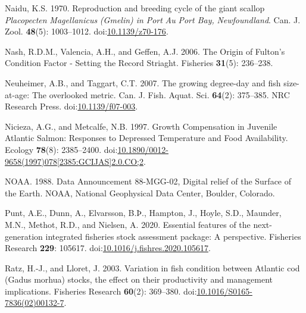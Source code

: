 \documentclass[
]{article}
\newlength{\cslhangindent}
\newlength{\cslentryspacingunit} %
\newenvironment{CSLReferences}[2] %
 {%
  \setlength{\parindent}{0pt}
  \ifodd #1
  \let\oldpar\par
  \def\par{\hangindent=\cslhangindent\oldpar}
  \fi
  \setlength{\parskip}{#2\cslentryspacingunit}
 }%
 {}
\begin{document}
\begin{CSLReferences}{1}{0}
\leavevmode{}%
Naidu, K.S. 1970. Reproduction and breeding cycle of the giant scallop {\emph{Placopecten}}{ \emph{Magellanicus}}{ \emph{\emph{(}}}{\emph{\emph{Gmelin}}}{\emph{\emph{) in}} }{\emph{\emph{Port}}}{ \emph{\emph{Au}} }{\emph{\emph{Port Bay}}}{\emph{\emph{,}} }{\emph{\emph{Newfoundland}}}. Can. J. Zool. \textbf{48}(5): 1003--1012. doi:\href{https://doi.org/10.1139/z70-176}{10.1139/z70-176}.

\leavevmode{}%
Nash, R.D.M., Valencia, A.H., and Geffen, A.J. 2006. The {Origin} of {Fulton}'s {Condition Factor} - {Setting} the {Record Striaght}. Fisheries \textbf{31}(5): 236--238.

\leavevmode{}%
Neuheimer, A.B., and Taggart, C.T. 2007. The growing degree-day and fish size-at-age: The overlooked metric. Can. J. Fish. Aquat. Sci. \textbf{64}(2): 375--385. {NRC Research Press}. doi:\href{https://doi.org/10.1139/f07-003}{10.1139/f07-003}.

\leavevmode{}%
Nicieza, A.G., and Metcalfe, N.B. 1997. Growth {Compensation} in {Juvenile Atlantic Salmon}: {Responses} to {Depressed Temperature} and {Food Availability}. Ecology \textbf{78}(8): 2385--2400. doi:\href{https://doi.org/10.1890/0012-9658(1997)078\%5B2385:GCIJAS\%5D2.0.CO;2}{10.1890/0012-9658(1997)078{[}2385:GCIJAS{]}2.0.CO;2}.

\leavevmode{}%
NOAA. 1988. Data {Announcement} 88-{MGG-02}, {Digital} relief of the {Surface} of the {Earth}. {NOAA, National Geophysical Data Center}, {Boulder, Colorado}.

\leavevmode{}%
Punt, A.E., Dunn, A., Elvarsson, B.Þ., Hampton, J., Hoyle, S.D., Maunder, M.N., Methot, R.D., and Nielsen, A. 2020. Essential features of the next-generation integrated fisheries stock assessment package: {A} perspective. Fisheries Research \textbf{229}: 105617. doi:\href{https://doi.org/10.1016/j.fishres.2020.105617}{10.1016/j.fishres.2020.105617}.

\leavevmode{}%
Ratz, H.-J., and Lloret, J. 2003. Variation in fish condition between {Atlantic} cod ({Gadus} morhua) stocks, the effect on their productivity and management implications. Fisheries Research \textbf{60}(2): 369--380. doi:\href{https://doi.org/10.1016/S0165-7836(02)00132-7}{10.1016/S0165-7836(02)00132-7}.


\end{CSLReferences}
\end{document}
